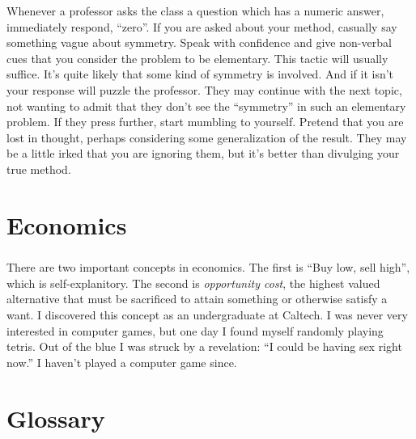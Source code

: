 Whenever a professor asks the class a question which has a numeric answer,
immediately respond, ``zero''.  If you are asked about your method, casually
say something vague about symmetry.  Speak with confidence and give 
non-verbal cues that you consider the problem to be elementary.
This tactic will usually suffice.  It's quite likely that some kind of 
symmetry is involved.  And if it isn't your response will puzzle the professor.
They may continue with the next topic, not wanting to admit that they
don't see the ``symmetry'' in such an elementary problem.  If they press
further, start mumbling to yourself.  Pretend that you are lost in thought,
perhaps considering some generalization of the result.   They may be a 
little irked that you are ignoring them, but it's better than divulging
your true method.













\raggedbottom
\chapter{Economics}
\flushbottom


\paragraph{}
There are two important concepts in economics.  The first is ``Buy
low, sell high'', which is self-explanitory.  The second is
\textit{opportunity cost}, the highest valued alternative that must be
sacrificed to attain something or otherwise satisfy a want.  I
discovered this concept as an undergraduate at Caltech.  I was never
very interested in computer games, but one day I found myself randomly
playing tetris.  Out of the blue I was struck by a revelation: ``I
could be having sex right now.''  I haven't played a computer game
since.




\raggedbottom
\chapter{Glossary}
\flushbottom


